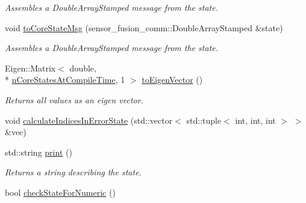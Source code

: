 \begin{DoxyCompactItemize}
\begin{DoxyCompactList}\small\item\em Assembles a Double\-Array\-Stamped message from the state. \end{DoxyCompactList}\item 
void \hyperlink{structmsf__core_1_1GenericState__T_a284c9a13e909d3a1d0d3d012e3445542}{to\-Core\-State\-Msg} (sensor\-\_\-fusion\-\_\-comm\-::\-Double\-Array\-Stamped \&state)
\begin{DoxyCompactList}\small\item\em Assembles a Double\-Array\-Stamped message from the state. \end{DoxyCompactList}\item 
\hypertarget{structmsf__core_1_1GenericState__T_a03efdc4aaadaf38d3beed4ed013c73a3}{Eigen\-::\-Matrix$<$ double, \\*
\hyperlink{structmsf__core_1_1GenericState__T_a20545d9aacd8f84bc1a97a873310cd5fabd9ce322dcc236ba424c7435e37a34f3}{n\-Core\-States\-At\-Compile\-Time}, 1 $>$ \hyperlink{structmsf__core_1_1GenericState__T_a03efdc4aaadaf38d3beed4ed013c73a3}{to\-Eigen\-Vector} ()}\label{structmsf__core_1_1GenericState__T_a03efdc4aaadaf38d3beed4ed013c73a3}

\begin{DoxyCompactList}\small\item\em Returns all values as an eigen vector. \end{DoxyCompactList}\item 
void \hyperlink{structmsf__core_1_1GenericState__T_aa9b0416f9a69c5dc7a2be0f36a911e3b}{calculate\-Indices\-In\-Error\-State} (std\-::vector$<$ std\-::tuple$<$ int, int, int $>$ $>$ \&vec)
\item 
\hypertarget{structmsf__core_1_1GenericState__T_a1b9703f4f0c7e9fe930808893626e6ef}{std\-::string \hyperlink{structmsf__core_1_1GenericState__T_a1b9703f4f0c7e9fe930808893626e6ef}{print} ()}\label{structmsf__core_1_1GenericState__T_a1b9703f4f0c7e9fe930808893626e6ef}

\begin{DoxyCompactList}\small\item\em Returns a string describing the state. \end{DoxyCompactList}\item 
\hypertarget{structmsf__core_1_1GenericState__T_ac540479ddebda9d50e3329b1e652eefe}{bool \hyperlink{structmsf__core_1_1GenericState__T_ac540479ddebda9d50e3329b1e652eefe}{check\-State\-For\-Numeric} ()}\label{structmsf__core_1_1GenericState__T_ac540479ddebda9d50e3329b1e652eefe}


\end{DoxyCompactItemize}

